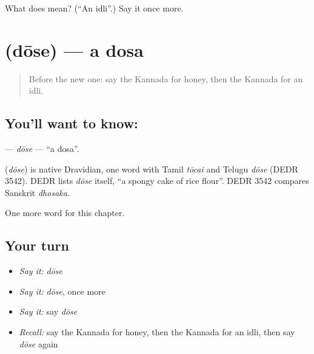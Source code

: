\begin{tcolorbox}[breakable,colback=teal!4,colframe=teal!35!black,title={Before you move on}]
What does  mean? (\textquotedblleft{}An idli\textquotedblright{}.) Say it once more.
\end{tcolorbox}
\section[\texorpdfstring{\kn{ದೋಸೆ} (dōse)}{ದೋಸೆ (dōse)}]{ (dōse) — a dosa}

\label{lesson:KA-C125-dose}



\begin{quote}
Before the new one: say the Kannada for honey, then the Kannada for an idli.
\end{quote}

\subsection*{You'll want to know: }
\textbf{} — \emph{dōse} — \textquotedblleft{}a dosa\textquotedblright{}.

\begin{cousinweb}
\textbf{} (\emph{dōse}) is native Dravidian, one word with Tamil \emph{tōcai} and Telugu \emph{dōse} (DEDR 3542). DEDR lists \emph{dōse} itself, \textquotedblleft{}a spongy cake of rice flour\textquotedblright{}. DEDR 3542 compares Sanskrit \emph{dhosaka}.
\end{cousinweb}

\begin{grammarlens}[title={What you've built}]
One more word for this chapter.
\end{grammarlens}

\subsection*{Your turn}
\begin{itemize}
\raggedright
  \item \emph{Say it:} \emph{dōse}
  \item \emph{Say it:} \emph{dōse}, once more
  \item \emph{Say it:} say \emph{dōse}
  \item \emph{Recall:} say the Kannada for honey, then the Kannada for an idli, then say \emph{dōse} again
\end{itemize}

